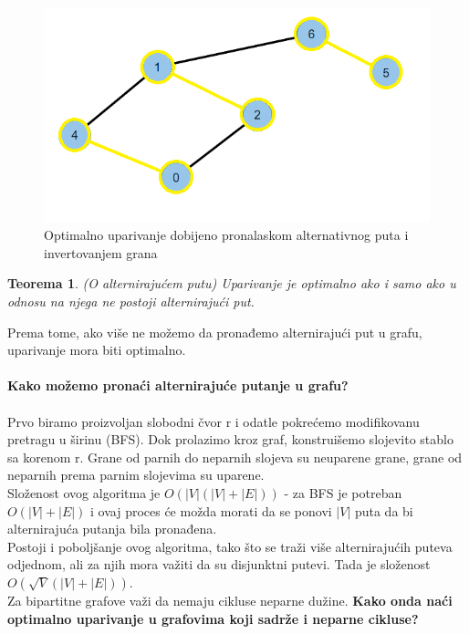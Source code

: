 \documentclass[11pt,a4paper]{article}
\theoremstyle{definition}
\newtheorem{teorema}{Teorema}
\begin{document}
\begin{figure}[H]
\begin{center}
\includegraphics[scale=0.7]{Graf 2 - optimalan.png}
\end{center}
\caption{Optimalno uparivanje dobijeno pronalaskom alternativnog puta i invertovanjem grana}
\label{graf 2 optimalan}
\end{figure}


\begin{teorema}
\textsl{(O alternirajućem putu) Uparivanje je optimalno ako i samo ako u odnosu na njega ne postoji alternirajući put.}
\end{teorema}
 Prema tome, ako više ne možemo da pronađemo alternirajući put u grafu, uparivanje mora biti optimalno.\\ \\
\textbf{Kako možemo pronaći alternirajuće putanje u grafu?} \\ \\ Prvo biramo proizvoljan slobodni čvor r i odatle pokrećemo modifikovanu pretragu u širinu (BFS). Dok prolazimo kroz graf, konstruišemo slojevito stablo sa korenom r. Grane od parnih do neparnih slojeva su neuparene grane, grane od neparnih prema parnim slojevima su uparene.\\
 Složenost ovog algoritma je $O(|V|(|V|+|E|))$ - za BFS je potreban $O(|V|+|E|)$ i ovaj proces će možda morati da se ponovi $|V|$ puta da bi alternirajuća putanja bila pronađena.\\ Postoji i poboljšanje ovog algoritma, tako što se traži više alternirajućih puteva odjednom, ali za njih mora važiti da su disjunktni putevi. Tada je složenost $O(\sqrt{V}(|V|+|E|))$.\\

Za bipartitne grafove važi da nemaju cikluse neparne dužine. \textbf{Kako onda naći optimalno uparivanje u grafovima koji sadrže i neparne cikluse?}
\end{document}
